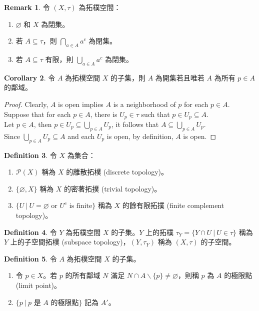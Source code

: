 \documentclass[12pt]{article}
\theoremstyle{definition}
\newtheorem{definition}{Definition}[section]
\newtheorem{remark}[definition]{Remark}
\newtheorem{corollary}[definition]{Corollary}
\newcommand\<{\langle}
\renewcommand\>{\rangle}
\begin{document}
\begin{CJK}{UTF8}{bsmi}
\begin{remark}
    令 $(X, \tau)$ 為拓樸空間：
    \begin{enumerate}
        \item $\varnothing$ 和 $X$ 為閉集。
        \item 若 $A\subseteq\tau$，則 $\bigcap_{a\in A}a^c$ 為閉集。
        \item 若 $A\subseteq\tau$ 有限，則 $\bigcup_{a\in A}a^c$ 為閉集。
    \end{enumerate}
\end{remark}

\begin{corollary}
    令 $A$ 為拓樸空間 $X$ 的子集，則 $A$ 為開集若且唯若 $A$ 為所有 $p\in A$ 的鄰域。
\end{corollary}
\begin{proof}
    Clearly, $A$ is open implies $A$ is a neighborhood of $p$ for each $p\in A$. \\
    Suppose that for each $p\in A$, there is $U_p\in\tau$ such that $p\in U_p\subseteq A$. \\
    Let $p\in A$, then $p\in U_p\subseteq\bigcup_{p\in A}U_p$, it follows that $A\subseteq\bigcup_{p\in A}U_p$. \\
    Since $\bigcup_{p\in A}U_p\subseteq A$ and each $U_p$ is open, by definition, $A$ is open.
\end{proof}

\begin{definition}
    令 $X$ 為集合：
    \begin{enumerate}
        \item $\mathcal{P}(X)$ 稱為 $X$ 的離散拓樸 (discrete topology)。
        \item $\{\varnothing, X\}$ 稱為 $X$ 的密著拓撲 (trivial topology)。
        \item $\{U\ |\ U=\varnothing\text{ or }U^c\text{ is finite}\}$ 稱為 $X$ 的餘有限拓撲 (finite complement topology)。
    \end{enumerate}
\end{definition}

\begin{definition}
    令 $Y$ 為拓樸空間 $X$ 的子集。$Y$ 上的拓樸 $\tau_Y=\{Y\cap U\ |\ U\in\tau\}$ 稱為 $Y$ 上的子空間拓樸 (subspace topology)，$(Y, \tau_Y)$ 稱為 $(X, \tau)$ 的子空間。
\end{definition}

\begin{definition}
    令 $A$ 為拓樸空間 $X$ 的子集。
    \begin{enumerate}
        \item 令 $p\in X$。若 $p$ 的所有鄰域 $N$ 滿足 $N\cap A\backslash\{p\}\ne\varnothing$，則稱 $p$ 為 $A$ 的極限點 (limit point)。
        \item $\{p\ |\ p\text{ 是 }A\text{ 的極限點}\}$ 記為 $A'$。
    \end{enumerate}
\end{definition}


\end{CJK}
\end{document}
